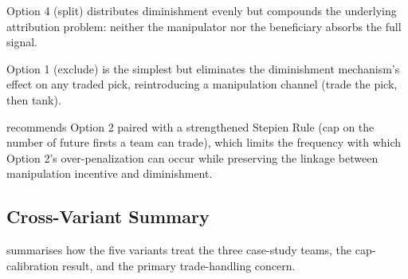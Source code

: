 Option 4 (split) distributes diminishment evenly but compounds the underlying attribution problem: neither the manipulator nor the beneficiary absorbs the full signal.

Option 1 (exclude) is the simplest but eliminates the diminishment mechanism's effect on any traded pick, reintroducing a manipulation channel (trade the pick, then tank).

\citet{highley2026solvable4} recommends Option 2 paired with a strengthened Stepien Rule (cap on the number of future firsts a team can trade), which limits the frequency with which Option 2's over-penalization can occur while preserving the linkage between manipulation incentive and diminishment.

\subsection{Cross-Variant Summary}
\label{sec:cross-variant}

 summarises how the five variants treat the three case-study teams, the cap-calibration result, and the primary trade-handling concern.

